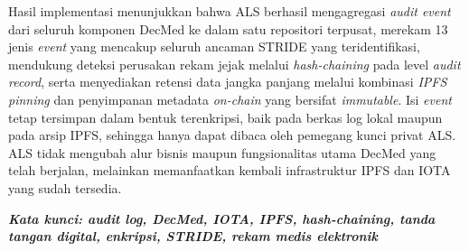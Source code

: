 \begin{singlespace}
	Hasil implementasi menunjukkan bahwa ALS berhasil mengagregasi \textit{audit event} dari seluruh komponen DecMed ke dalam satu repositori terpusat, merekam 13 jenis \textit{event} yang mencakup seluruh ancaman STRIDE yang teridentifikasi, mendukung deteksi perusakan rekam jejak melalui \textit{hash-chaining} pada level \textit{audit record}, serta menyediakan retensi data jangka panjang melalui kombinasi \textit{IPFS pinning} dan penyimpanan metadata \textit{on-chain} yang bersifat \textit{immutable}. Isi \textit{event} tetap tersimpan dalam bentuk terenkripsi, baik pada berkas log lokal maupun pada arsip IPFS, sehingga hanya dapat dibaca oleh pemegang kunci privat ALS. ALS tidak mengubah alur bisnis maupun fungsionalitas utama DecMed yang telah berjalan, melainkan memanfaatkan kembali infrastruktur IPFS dan IOTA yang sudah tersedia.

	\textbf{\textit{Kata kunci: audit log, DecMed, IOTA, IPFS, hash-chaining, tanda tangan digital, enkripsi, STRIDE, rekam medis elektronik}}

\end{singlespace}
\clearpage